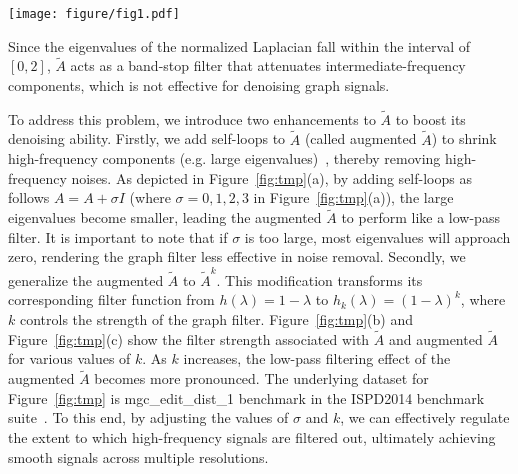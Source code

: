 \begin{figure*}[htbp]
\texttt{[image: figure/fig1.pdf]}
\centering  
\vspace{-0.5em}
\caption{Eigenvalue distributions of normalized Laplacians with different graph filters: (a) under different self-loops. (b) with $\tilde{A}$ filter at various $k$, (c) with augmented $\tilde{A}$ filter at various $k$.}\label{fig:tmp}
\vspace{-1em}
\end{figure*}

Since the eigenvalues of the normalized Laplacian fall within the interval of $[0,2]$, $\tilde{A}$ acts as a band-stop filter that attenuates intermediate-frequency components, which is not effective for denoising graph signals. 

To address this problem, we introduce two enhancements to $\tilde{A}$ to boost its denoising ability.
Firstly, we add self-loops to $\tilde{A}$ (called augmented $\tilde{A}$) to shrink high-frequency components (e.g. large eigenvalues)~\cite{sgc}, thereby removing high-frequency noises.
As depicted in Figure~\ref{fig:tmp}(a), by adding self-loops as follows $A=A+\sigma I$ (where $\sigma=0, 1, 2, 3$ in Figure~\ref{fig:tmp}(a)), the large eigenvalues become smaller, leading the augmented $\tilde{A}$ to perform like a low-pass filter. 
It is important to note that if $\sigma$ is too large, most eigenvalues will approach zero, rendering the graph filter less effective in noise removal.
Secondly, we generalize the augmented $\tilde{A}$ to $\tilde{A}^k$. This modification transforms its corresponding filter function from $h(\lambda)=1-\lambda$ to $h_k(\lambda)=(1-\lambda)^k$, where $k$ controls the strength of the graph filter. Figure~\ref{fig:tmp}(b) and Figure~\ref{fig:tmp}(c) show the filter strength associated with $\tilde{A}$ and augmented $\tilde{A}$ for various values of $k$. As $k$ increases, the low-pass filtering effect of the augmented $\tilde{A}$ becomes more pronounced.
The underlying dataset for Figure~\ref{fig:tmp} is mgc\_edit\_dist\_1 benchmark in the ISPD2014 benchmark suite~\cite{ispd2014}. 
To this end, by adjusting the values of $\sigma$ and $k$, we can effectively regulate the extent to which high-frequency signals are filtered out, ultimately achieving smooth signals across multiple resolutions.

